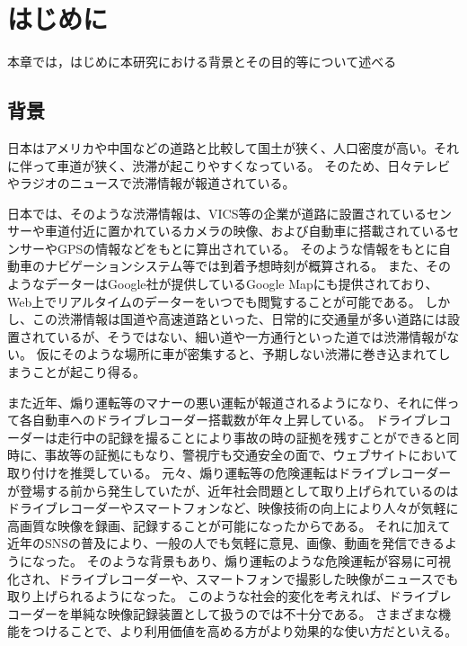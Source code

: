 \chapter{はじめに}
本章では，はじめに本研究における背景とその目的等について述べる
\section{背景}
日本はアメリカや中国などの道路と比較して国土が狭く、人口密度が高い。それに伴って車道が狭く、渋滞が起こりやすくなっている。
そのため、日々テレビやラジオのニュースで渋滞情報が報道されている。


日本では、そのような渋滞情報は、VICS等の企業が道路に設置されているセンサーや車道付近に置かれているカメラの映像、および自動車に搭載されているセンサーやGPSの情報などをもとに算出されている。
そのような情報をもとに自動車のナビゲーションシステム等では到着予想時刻が概算される。
また、そのようなデーターはGoogle社が提供しているGoogle Mapにも提供されており、Web上でリアルタイムのデーターをいつでも閲覧することが可能である。
しかし、この渋滞情報は国道や高速道路といった、日常的に交通量が多い道路には設置されているが、そうではない、細い道や一方通行といった道では渋滞情報がない。
仮にそのような場所に車が密集すると、予期しない渋滞に巻き込まれてしまうことが起こり得る。

また近年、煽り運転等のマナーの悪い運転が報道されるようになり、それに伴って各自動車へのドライブレコーダー搭載数が年々上昇している。
ドライブレコーダーは走行中の記録を撮ることにより事故の時の証拠を残すことができると同時に、事故等の証拠にもなり、警視庁も交通安全の面で、ウェブサイトにおいて取り付けを推奨している。
元々、煽り運転等の危険運転はドライブレコーダーが登場する前から発生していたが、近年社会問題として取り上げられているのはドライブレコーダーやスマートフォンなど、映像技術の向上により人々が気軽に高画質な映像を録画、記録することが可能になったからである。
それに加えて近年のSNSの普及により、一般の人でも気軽に意見、画像、動画を発信できるようになった。
そのような背景もあり、煽り運転のような危険運転が容易に可視化され、ドライブレコーダーや、スマートフォンで撮影した映像がニュースでも取り上げられるようになった。
このような社会的変化を考えれば、ドライブレコーダーを単純な映像記録装置として扱うのでは不十分である。
さまざまな機能をつけることで、より利用価値を高める方がより効果的な使い方だといえる。

